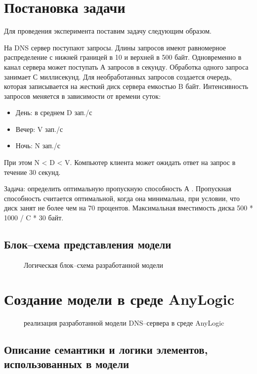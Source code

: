 \newpage
\section{Постановка задачи}
Для проведения эксперимента поставим задачу следующим образом.

На DNS сервер поступают запросы. Длины запросов имеют равномерное распределение с нижней границей
в 10 и верхней в 500 байт. Одновременно в канал сервера может поступать А запросов в секунду. Обработка одного
запроса занимает С миллисекунд. Для необработанных запросов создается очередь, которая записывается
на жесткий диск сервера емкостью B байт. Интенсивность запросов меняется в зависимости от времени суток:
\begin{itemize}
    \item День: в среднем D зап./с
    \item Вечер: V зап./с
    \item Ночь: N зап./с
\end{itemize}

При этом N < D < V. Компьютер клиента может ожидать ответ на запрос в течение 30 секунд.

Задача: определить оптимальную пропускную способность А . Пропускная способность считается оптимальной, когда она минимальна, при условии,
что диск занят не более чем на 70 процентов. Максимальная вместимость диска 500 * 1000 / C * 30  байт.

\subsection{Блок--схема представления модели}

\begin{figure} [h]
    \caption{Логическая блок--схема разработанной модели}
\end{figure}

\newpage
\section{Создание модели в среде AnyLogic}
\begin{figure} [h]
    \caption{реализация разработанной модели DNS--сервера в среде AnyLogic}
\end{figure}


\subsection{Описание семантики и логики элементов, использованных в модели}

